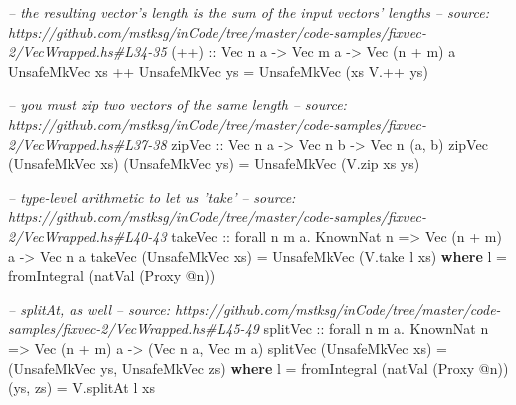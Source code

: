 \documentclass[]{article}
\newenvironment{Shaded}{}{}
\newcommand{\KeywordTok}[1]{\textcolor[rgb]{0.00,0.44,0.13}{\textbf{#1}}}
\newcommand{\DataTypeTok}[1]{\textcolor[rgb]{0.56,0.13,0.00}{#1}}
\newcommand{\CommentTok}[1]{\textcolor[rgb]{0.38,0.63,0.69}{\textit{#1}}}
\newcommand{\OtherTok}[1]{\textcolor[rgb]{0.00,0.44,0.13}{#1}}
\newcommand{\FunctionTok}[1]{\textcolor[rgb]{0.02,0.16,0.49}{#1}}
\newcommand{\NormalTok}[1]{#1}
\begin{document}
\begin{Shaded}
\begin{Highlighting}[]
\CommentTok{-- the resulting vector's length is the sum of the input vectors' lengths}
\CommentTok{-- source: https://github.com/mstksg/inCode/tree/master/code-samples/fixvec-2/VecWrapped.hs#L34-35}
\OtherTok{(++) ::} \DataTypeTok{Vec}\NormalTok{ n a }\OtherTok{->} \DataTypeTok{Vec}\NormalTok{ m a }\OtherTok{->} \DataTypeTok{Vec}\NormalTok{ (n }\FunctionTok{+}\NormalTok{ m) a}
\DataTypeTok{UnsafeMkVec}\NormalTok{ xs }\FunctionTok{++} \DataTypeTok{UnsafeMkVec}\NormalTok{ ys }\FunctionTok{=} \DataTypeTok{UnsafeMkVec}\NormalTok{ (xs }\FunctionTok{V.++}\NormalTok{ ys)}

\CommentTok{-- you must zip two vectors of the same length}
\CommentTok{-- source: https://github.com/mstksg/inCode/tree/master/code-samples/fixvec-2/VecWrapped.hs#L37-38}
\OtherTok{zipVec ::} \DataTypeTok{Vec}\NormalTok{ n a }\OtherTok{->} \DataTypeTok{Vec}\NormalTok{ n b }\OtherTok{->} \DataTypeTok{Vec}\NormalTok{ n (a, b)}
\NormalTok{zipVec (}\DataTypeTok{UnsafeMkVec}\NormalTok{ xs) (}\DataTypeTok{UnsafeMkVec}\NormalTok{ ys) }\FunctionTok{=} \DataTypeTok{UnsafeMkVec}\NormalTok{ (V.zip xs ys)}

\CommentTok{-- type-level arithmetic to let us 'take'}
\CommentTok{-- source: https://github.com/mstksg/inCode/tree/master/code-samples/fixvec-2/VecWrapped.hs#L40-43}
\OtherTok{takeVec ::}\NormalTok{ forall n m a}\FunctionTok{.} \DataTypeTok{KnownNat}\NormalTok{ n }\OtherTok{=>} \DataTypeTok{Vec}\NormalTok{ (n }\FunctionTok{+}\NormalTok{ m) a }\OtherTok{->} \DataTypeTok{Vec}\NormalTok{ n a}
\NormalTok{takeVec (}\DataTypeTok{UnsafeMkVec}\NormalTok{ xs) }\FunctionTok{=} \DataTypeTok{UnsafeMkVec}\NormalTok{ (V.take l xs)}
  \KeywordTok{where}
\NormalTok{    l }\FunctionTok{=}\NormalTok{ fromIntegral (natVal (}\DataTypeTok{Proxy} \FunctionTok{@}\NormalTok{n))}

\CommentTok{-- splitAt, as well}
\CommentTok{-- source: https://github.com/mstksg/inCode/tree/master/code-samples/fixvec-2/VecWrapped.hs#L45-49}
\OtherTok{splitVec ::}\NormalTok{ forall n m a}\FunctionTok{.} \DataTypeTok{KnownNat}\NormalTok{ n }\OtherTok{=>} \DataTypeTok{Vec}\NormalTok{ (n }\FunctionTok{+}\NormalTok{ m) a }\OtherTok{->}\NormalTok{ (}\DataTypeTok{Vec}\NormalTok{ n a, }\DataTypeTok{Vec}\NormalTok{ m a)}
\NormalTok{splitVec (}\DataTypeTok{UnsafeMkVec}\NormalTok{ xs) }\FunctionTok{=}\NormalTok{ (}\DataTypeTok{UnsafeMkVec}\NormalTok{ ys, }\DataTypeTok{UnsafeMkVec}\NormalTok{ zs)}
  \KeywordTok{where}
\NormalTok{    l }\FunctionTok{=}\NormalTok{ fromIntegral (natVal (}\DataTypeTok{Proxy} \FunctionTok{@}\NormalTok{n))}
\NormalTok{    (ys, zs) }\FunctionTok{=}\NormalTok{ V.splitAt l xs}
\end{Highlighting}
\end{Shaded}
\end{document}
